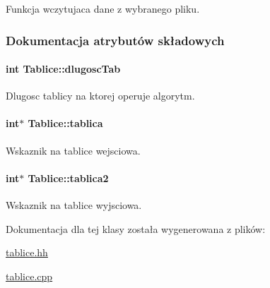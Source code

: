 Funkcja wczytujaca dane z wybranego pliku. 



\subsubsection{Dokumentacja atrybutów składowych}
\hypertarget{class_tablice_a6348e559c75b34c1a6006843c47fc7f1}{
\paragraph[{dlugosc\-Tab}]{\setlength{\rightskip}{0pt plus 5cm}int Tablice\-::dlugosc\-Tab\hspace{0.3cm}{\ttfamily [private]}}}\label{class_tablice_a6348e559c75b34c1a6006843c47fc7f1}


Dlugosc tablicy na ktorej operuje algorytm. 

\hypertarget{class_tablice_afd068f784491928fd66d9028a1d08f15}{
\paragraph[{tablica}]{\setlength{\rightskip}{0pt plus 5cm}int$\ast$ Tablice\-::tablica\hspace{0.3cm}{\ttfamily [private]}}}\label{class_tablice_afd068f784491928fd66d9028a1d08f15}


Wskaznik na tablice wejsciowa. 

\hypertarget{class_tablice_a936c25baffe3fb6cb49ba334acaa9a85}{
\paragraph[{tablica2}]{\setlength{\rightskip}{0pt plus 5cm}int$\ast$ Tablice\-::tablica2\hspace{0.3cm}{\ttfamily [private]}}}\label{class_tablice_a936c25baffe3fb6cb49ba334acaa9a85}


Wskaznik na tablice wyjsciowa. 



Dokumentacja dla tej klasy została wygenerowana z plików\-:\begin{DoxyCompactItemize}
\item 
\hyperlink{tablice_8hh}{tablice.\-hh}\item 
\hyperlink{tablice_8cpp}{tablice.\-cpp}\end{DoxyCompactItemize}
